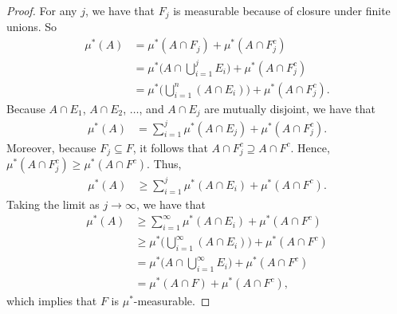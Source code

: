 \documentclass[10pt]{article}
\begin{document}
\begin{itemize}
\begin{proof}
    For any $j$, we have that $F_j$ is measurable because of closure under finite unions. So
    \begin{align*}
      \mu^*(A) 
      &= \mu^*(A \cap F_j) + \mu^*(A \cap F_j^c) \\
      &= \mu^*\bigg( A \cap \bigcup_{i=1}^j E_i\bigg) + \mu^*(A \cap F_j^c) \\
      &= \mu^*\bigg( \bigcup_{i=1}^n ( A \cap E_i) \bigg) + \mu^*(A \cap F_j^c).
    \end{align*}
    Because $A \cap E_1$, $A \cap E_2$, $\dotsc$, and $A \cap E_j$ are mutually disjoint, we have that
    \begin{align*}
      \mu^*(A)
      &= \sum_{i=1}^j \mu^*( A \cap E_j) + \mu^*(A \cap F_j^c).
    \end{align*}
    Moreover, because $F_j \subseteq F$, it follows that $A \cap F_j^c \supseteq A \cap F^c$. Hence, $\mu^*(A \cap F_j^c) \geq \mu^*(A \cap F^c)$. Thus,
    \begin{align*}
      \mu^*(A)
      &\geq \sum_{i=1}^j \mu^*( A \cap E_i) + \mu^*(A \cap F^c).
    \end{align*}
    Taking the limit as $j \rightarrow \infty$, we have that
    \begin{align*}
      \mu^*(A) 
      &\geq \sum_{i=1}^\infty \mu^*( A \cap E_i) + \mu^*(A \cap F^c) \\
      &\geq \mu^*\bigg( \bigcup_{i=1}^\infty (A \cap E_i) \bigg) + \mu^*(A \cap F^c) \\
      &= \mu^*\bigg( A \cap \bigcup_{i=1}^\infty E_i \bigg) + \mu^*(A \cap F^c) \\
      &= \mu^*( A \cap F) + \mu^*(A \cap F^c),
    \end{align*}
    which implies that $F$ is $\mu^*$-measurable.
    

\end{proof}
\end{itemize}
\end{document}

